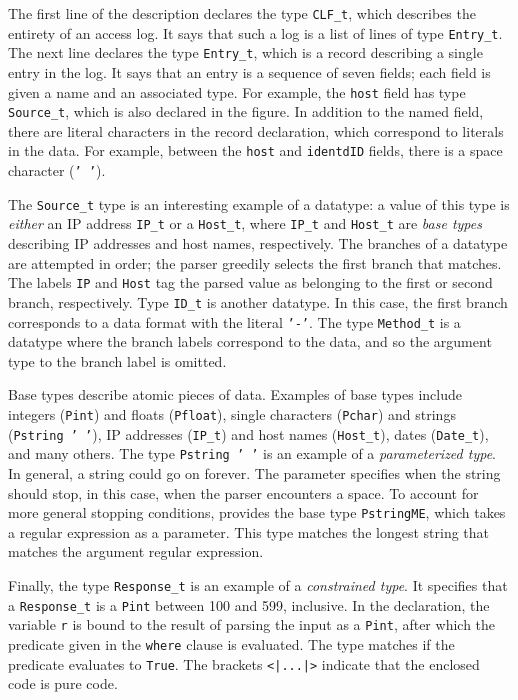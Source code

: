 \documentclass{sig-alternate}
\begin{document}
The first line of the description declares the type \texttt{CLF\_t},
which describes the entirety of an access log.  It says that such a
log is a list of lines of type \texttt{Entry\_t}.  The next line
declares the type \texttt{Entry\_t}, which is a record describing a
single entry in the log.  It says that an entry is a sequence of seven
fields; each field is given a name and an associated type.  For
example, the \texttt{host} field has type \texttt{Source\_t}, which is
also declared in the figure.  In addition to the named field, there
are literal characters in the record declaration, which correspond to
literals in the data.  For example, between the \texttt{host} and
\texttt{identdID} fields, there is a space character (\texttt{' '}).

The \texttt{Source\_t} type is an interesting example of a
datatype: a value of this type is \textit{either} an IP address
\texttt{IP\_t} or a \texttt{Host\_t}, where \texttt{IP\_t} and
\texttt{Host\_t} are \pads{} \textit{base types} describing IP
addresses and host names, respectively.  The branches of a datatype
are attempted in order; the parser greedily selects the first branch
that matches.   The labels \texttt{IP} and \texttt{Host} tag the
parsed value as belonging to the first or second branch, respectively.
Type \texttt{ID\_t} is another datatype. In this case, the first
branch corresponds to a data format with the literal \texttt{'-'}. The
type \texttt{Method\_t} is a datatype where the branch labels
correspond to the data, and so the argument type to the branch label
is omitted.  

Base types describe atomic pieces of data.  Examples of base types include integers
(\texttt{Pint}) and floats (\texttt{Pfloat}), single characters
(\texttt{Pchar}) and strings (\texttt{Pstring ' '}), IP addresses
(\texttt{IP\_t}) and host names (\texttt{Host\_t}), dates
(\texttt{Date\_t}), and many others. 
The type
\texttt{Pstring ' '} is an example of a \textit{parameterized type}.
In general, a string could go on forever.  The parameter specifies
when the string should stop, in this case, when the parser encounters
a space.  To account for more general stopping conditions,
\padshaskell{} provides the base type \texttt{PstringME}, which takes
a regular expression as a parameter.  This type matches the longest
string that matches the argument regular expression.

Finally, the type \texttt{Response\_t} is an example of a
\textit{constrained type}. It specifies that a \texttt{Response\_t} is
a \texttt{Pint} between 100 and 599, inclusive. In the declaration,
the variable \texttt{r} is bound to the result of parsing the input as
a \texttt{Pint}, after which the predicate given in the \texttt{where}
clause is evaluated. The type matches if the predicate evaluates to
\texttt{True}.  The brackets \texttt{<|...|>} indicate that
the enclosed code is pure \haskell{} code.
\end{document}
